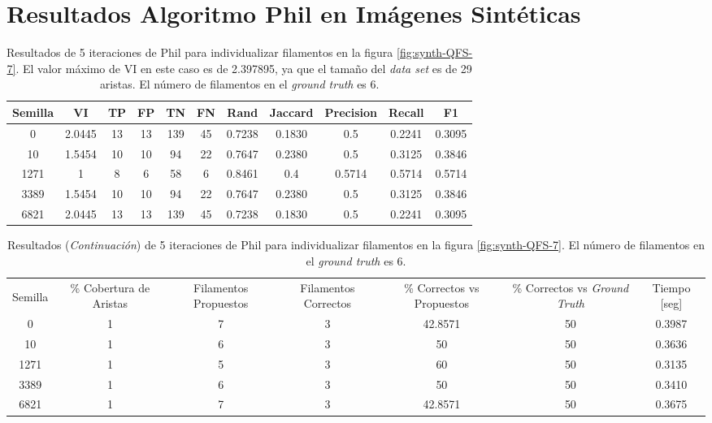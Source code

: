 \label{chap:apendice}

\section{Resultados Algoritmo Phil en Im\'agenes Sint\'eticas}

\begin{table}[h]
    \centering
    \begin{tabular}{|c|c|c|c|c|c|c|c|c|c|c|}
    \hline
        Semilla & VI & TP & FP &TN &FN & Rand	& Jaccard &	Precision &	Recall &	F1 \\ \hline 
        0    & 2.0445 & 13 & 13 & 139 & 45 & 0.7238 & 0.1830 & 0.5 & 0.2241 & 0.3095\\
        10   & 1.5454 & 10 & 10 & 94  & 22 & 0.7647 & 0.2380 & 0.5 & 0.3125 & 0.3846\\
        1271 & 1 & 8  & 6  & 58  & 6  & 0.8461 & 0.4 & 0.5714 & 0.5714 & 0.5714\\
        3389 & 1.5454 & 10 & 10 & 94  & 22 & 0.7647 & 0.2380 & 0.5 & 0.3125 & 0.3846\\
        6821 & 2.0445 & 13 & 13 & 139 & 45 & 0.7238 & 0.1830 & 0.5  & 0.2241 & 0.3095\\
        \hline
    \end{tabular}
    \caption{Resultados de 5 iteraciones de Phil para individualizar filamentos en la figura \ref{fig:synth-QFS-7}. El valor m\'aximo de VI en este caso es de 2.397895, ya que el tama\~no del {\it data set} es de 29 aristas. El n\'umero de filamentos en el {\it ground truth} es 6.}
    \label{tab:Synth-QuantitativeIFS-Fig7DetailedResults1}
\end{table}
\addtocounter{table}{-1}
\begin{table}[h]
    \centering
    \begin{tabular}{|c|c|c|c|c|c|c|}
    \hline
         & \multirow{4}{2cm}{\centering \% Cobertura de Aristas} & \multirow{4}{2cm}{Filamentos Propuestos} & \multirow{4}{2cm}{Filamentos Correctos} & \multirow{4}{2.5cm}{\% Correctos vs Propuestos} & \multirow{4}{2.5cm}{\centering \% Correctos vs {\it Ground Truth}} & \multirow{4}{1.2cm}{\centering Tiempo [seg]} \\
         &  &  &  & & &  \\
        Semilla &  &  &  & & &  \\
        &  &  &  & & &  \\ \hline 
        0 & 1 & 7 & 3 & 42.8571 & 50 & 0.3987\\
        10 & 1 & 6 & 3 & 50 & 50 & 0.3636\\
        1271 & 1 & 5 & 3 & 60 & 50 & 0.3135\\
        3389 & 1 & 6 & 3 & 50 & 50 & 0.3410\\
        6821 & 1 & 7 & 3 & 42.8571 & 50 & 0.3675\\
        \hline
    \end{tabular}
    \caption{Resultados ({\it Continuaci\'on}) de 5 iteraciones de Phil para individualizar filamentos en la figura \ref{fig:synth-QFS-7}. El n\'umero de filamentos en el {\it ground truth} es 6.}
\end{table}


